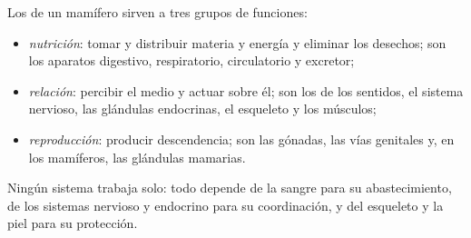 \begin{proposition}\label{prop:b1:mammal-organization:functions}
Los  de un mamífero sirven a tres grupos de funciones:
\begin{itemize}
  \item \emph{nutrición}: tomar y distribuir
        materia y energía y eliminar los desechos; son los aparatos
        digestivo, respiratorio, circulatorio y excretor;
  \item \emph{relación}: percibir el medio y
        actuar sobre él; son los  de los sentidos, el sistema
        nervioso, las glándulas endocrinas, el esqueleto y los músculos;
  \item \emph{reproducción}: producir
        descendencia; son las gónadas, las vías genitales y, en los
        mamíferos, las glándulas mamarias.
\end{itemize}
Ningún sistema trabaja solo: todo  depende de la sangre para su
abastecimiento, de los sistemas nervioso y endocrino para su coordinación, y
del esqueleto y la piel para su protección.
\end{proposition}

